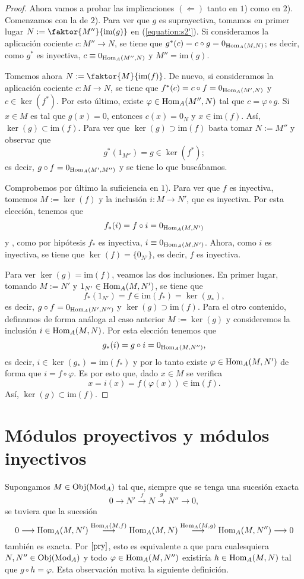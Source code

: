\documentclass[../main.tex]{subfiles}
\begin{document}
\begin{proof}
	Ahora vamos a probar las implicaciones $(\Leftarrow)$ tanto en $1$) como en $2$). Comenzamos con la de $2$). Para ver que $g$ es suprayectiva, tomamos en primer lugar $N:=\faktor{M''}{\text{im}(g)}$ en (\ref{equation:s2'}). Si consideramos la aplicación cociente $c:M''\longrightarrow N$, se tiene que $g^*(c)=c\circ g=0_{\operatorname{Hom}_A(M,N)}$; es decir, como $g^*$ es inyectiva, $c\equiv 0_{\operatorname{Hom}_A(M'',N)}$ y $M''=\text{im}(g)$.
	
	Tomemos ahora $N:=\faktor{M}{\text{im}(f)}$. De nuevo, si consideramos la aplicación cociente $c:M\longrightarrow N$, se tiene que $f^*(c)=c\circ f=0_{\operatorname{Hom}_A(M',N)}$ y $c\in\ker(f^*)$. Por esto último, existe $\varphi\in\operatorname{Hom}_A(M'',N)$ tal que $c=\varphi\circ g$. Si $x\in M$ es tal que $g(x)=0$, entonces $c(x)=0_N$ y $x\in\text{im}(f)$. Así, $\ker(g)\subset\text{im}(f)$. Para ver que $\ker(g)\supset\text{im}(f)$ basta tomar $N:=M''$ y observar que $$g^*(1_{M''})=g\in\ker(f^*);$$ es decir, $g\circ f=0_{\operatorname{Hom}_A(M',M'')}$ y se tiene lo que buscábamos.
	
	Comprobemos por último la suficiencia en $1$). Para ver que $f$ es inyectiva, tomemos $M:=\ker(f)$ y la inclusión $i:M\longrightarrow N'$, que es inyectiva. Por esta elección, tenemos que
	$$f_*(i)=f\circ i=0_{\operatorname{Hom}_A(M,N')}$$
	y , como por hipótesis $f_*$ es inyectiva, $i\equiv 0_{\operatorname{Hom}_A(M,N')}$. Ahora, como $i$ es inyectiva, se tiene que $\ker(f)=\{0_{N'}\}$, es decir, $f$ es inyectiva.
	
	Para ver $\ker(g)=\text{im}(f)$, veamos las dos inclusiones. En primer lugar, tomando $M:=N'$ y $1_{N'}\in\operatorname{Hom}_A(M,N')$, se tiene que
	$$f_*(1_{N'})=f\in\text{im}(f_*)=\ker(g_*),$$
	es decir, $g\circ f=0_{\operatorname{Hom}_A(N',N'')}$ y $\ker(g)\supset\text{im}(f)$. Para el otro contenido, definamos de forma análoga al caso anterior $M:=\ker(g)$ y consideremos la inclusión $i\in\operatorname{Hom}_A(M,N)$. Por esta elección tenemos que
	$$g_*(i)=g\circ i=0_{\operatorname{Hom}_A(M,N'')},$$
	es decir, $i\in\ker(g_*)=\text{im}(f_*)$ y por lo tanto existe $\varphi\in\operatorname{Hom}_A(M,N')$ de forma que $i=f\circ\varphi$. Es por esto que, dado $x\in M$ se verifica
	$$x=i(x)=f(\varphi(x))\in\text{im}(f).$$
	Así, $\ker(g)\subset\text{im}(f)$.
\end{proof}

\section{Módulos proyectivos y módulos inyectivos}
Supongamos $M\in\operatorname{Obj}(\operatorname{Mod}_A)$ tal que, siempre que se tenga una sucesión exacta
$$0\longrightarrow N'\overset{f}{\longrightarrow}N\overset{g}{\longrightarrow}N''\longrightarrow 0,$$
se tuviera que la sucesión
$$0\longrightarrow \operatorname{Hom}_A(M,N')\overset{\operatorname{Hom}_A(M,f)}{\longrightarrow}\operatorname{Hom}_A(M,N)\overset{\operatorname{Hom}_A(M,g)}{\longrightarrow}\operatorname{Hom}_A(M,N'')\longrightarrow0$$
también es exacta. Por $\ref{pry}$, esto es equivalente a que para cualesquiera $N,N''\in\operatorname{Obj}(\operatorname{Mod}_A)$ y todo $\varphi\in\operatorname{Hom}_A(M,N'')$ existiría $h\in\operatorname{Hom}_A(M,N)$ tal que $g\circ h=\varphi$. Esta observación motiva la siguiente definición.
\end{document}
